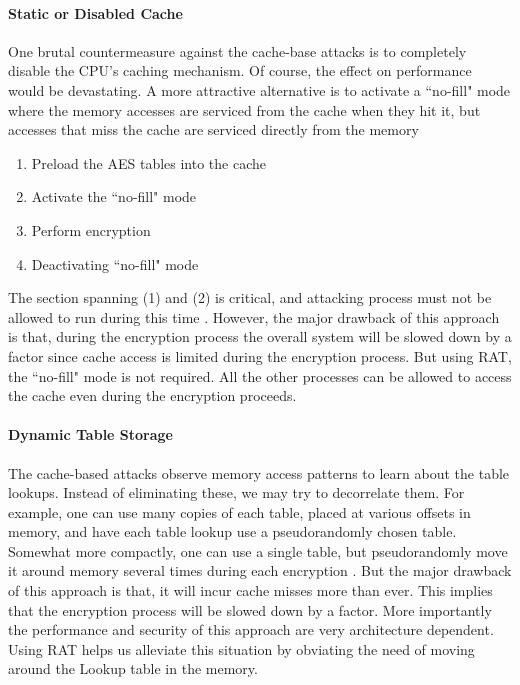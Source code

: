 \documentclass[3p]{elsarticle}
\begin{document}
\paragraph{Static or Disabled Cache}
One brutal countermeasure against the cache-base attacks is to completely disable the CPU's caching mechanism. Of course, the effect on performance would be devastating. A more attractive alternative is to activate a ``no-fill" mode where the memory accesses are serviced from the cache when they hit it, but accesses that miss the cache are serviced directly from the memory

\begin{enumerate}
\item Preload the AES tables into the cache
\item Activate the ``no-fill" mode
\item Perform encryption
\item Deactivating ``no-fill" mode
\end{enumerate}

The section spanning (1) and (2) is critical, and attacking process must not be allowed to run during this time \citep{osvik}. However, the major drawback of this approach is that, during the encryption process the overall system will be slowed down by a factor since cache access is limited during the encryption process. But using RAT, the ``no-fill" mode is not required. All the other processes can be allowed to access the cache even during the encryption proceeds.\\

\paragraph{Dynamic Table Storage}
The cache-based attacks observe memory access patterns to learn about the table lookups. Instead of eliminating these, we may try to decorrelate them. For example, one can use many copies of each table, placed at various offsets in memory, and have each table lookup use a pseudorandomly chosen table. Somewhat more compactly, one can use a single table, but pseudorandomly move it around memory several times during each encryption \citep{osvik}. But the major drawback of this approach is that, it will incur cache misses more than ever. This implies that the encryption process will be slowed down by a factor. More importantly the performance and security of this approach are very architecture dependent. Using RAT helps us alleviate this situation by obviating the need of moving around the Lookup table in the memory.
\end{document}

